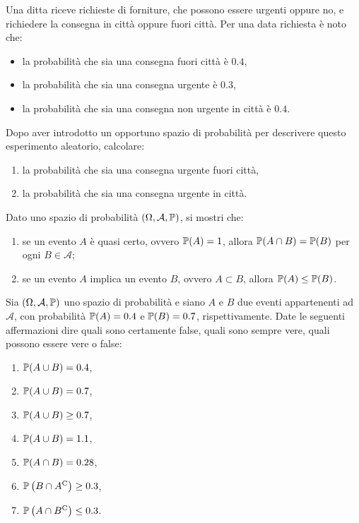 \Esercizio{}

Una ditta riceve richieste di forniture, che possono essere urgenti oppure no, e richiedere la consegna in città oppure fuori città. Per una data richiesta è noto che:
\begin{itemize}
	\item la probabilità che sia una consegna fuori città è $0.4$,
	\item la probabilità che sia una consegna urgente è $0.3$,
	\item la probabilità che sia una consegna non urgente in città è $0.4$.
\end{itemize}
Dopo aver introdotto un opportuno spazio di probabilità per descrivere questo esperimento aleatorio, calcolare:
\begin{enumerate}
	\item la probabilità che sia una consegna urgente fuori città,
	\item la probabilità che sia una consegna urgente in città.
\end{enumerate}

\Esercizio{}

Dato uno spazio di probabilità $( \Omega ,\mathcal{A} ,\mathbb{P})$, si mostri che:
\begin{enumerate}
	\item se un evento $A$ è quasi certo, ovvero $\mathbb{P}( A) =1$, allora $\mathbb{P}( A\cap B) =\mathbb{P}( B)$ per ogni $B\in \mathcal{A}$;
	\item se un evento $A$ implica un evento $B$, ovvero $A\subset B$, allora $\mathbb{P}( A) \leq \mathbb{P}( B)$.
\end{enumerate}

\Esercizio{}

Sia $( \Omega ,\mathcal{A} ,\mathbb{P})$ uno spazio di probabilità e siano $A$ e $B$ due eventi appartenenti ad $\mathcal{A}$, con probabilità $\mathbb{P}( A) =0.4$ e $\mathbb{P}( B) =0.7$, rispettivamente. Date le seguenti affermazioni dire quali sono certamente false, quali sono sempre vere, quali possono essere vere o false:
\begin{enumerate}
	\item $\mathbb{P}( A\cup B) =0.4$,
	\item $\mathbb{P}( A\cup B) =0.7$,
	\item $\mathbb{P}( A\cup B) \geq 0.7$,
	\item $\mathbb{P}( A\cup B) =1.1$,
	\item $\mathbb{P}( A\cap B) =0.28$,
	\item $\mathbb{P}\left( B\cap A^{\mathrm{C}}\right) \geq 0.3$,
	\item $\mathbb{P}\left( A\cap B^{\mathrm{C}}\right) \leq 0.3$.
\end{enumerate}

